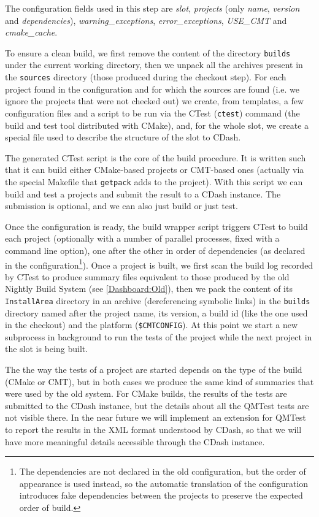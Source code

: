 \documentclass{lhcbnote}
\begin{document}
The configuration fields used in this step are \emph{slot}, \emph{projects}
(only \emph{name}, \emph{version} and \emph{dependencies}),
\emph{warning\_exceptions}, \emph{error\_exceptions}, \emph{USE\_CMT} and
\emph{cmake\_cache}.

To ensure a clean build, we first remove the content of the directory
\texttt{builds} under the current working directory, then we unpack all the
archives present in the \texttt{sources} directory (those produced during the
checkout step).  For each project found in the configuration and for which the
sources are found (i.e. we ignore the projects that were not checked out) we
create, from templates, a few configuration files and a script to be run via the
CTest\cite{CMake} (\texttt{ctest}) command (the build and test tool distributed
with CMake), and, for the whole slot, we create a special file used to describe
the structure of the slot to CDash.

The generated CTest script is the core of the build procedure.  It is written
such that it can build either CMake-based projects or CMT-based\cite{CMT} ones
(actually via the special Makefile that \texttt{getpack} adds to the project).
With this script we can build and test a projects and submit the result to a
CDash instance. The submission is optional, and we can also just build or just
test.

Once the configuration is ready, the build wrapper script triggers CTest to
build each project (optionally with a number of parallel processes, fixed with a
command line option), one after the other in order of dependencies (as declared
in the configuration\footnote{The dependencies are not declared in the old
configuration, but the order of appearance is used instead, so the automatic
translation of the configuration introduces fake dependencies between the
projects to preserve the expected order of build.}).  Once a project is built,
we first scan the build log recorded by CTest to produce summary files
equivalent to those produced by the old Nightly Build System (see
\ref{Dashboard:Old}), then we pack the content of its \texttt{InstallArea}
directory in an archive (dereferencing symbolic links) in the \texttt{builds}
directory named after the project name, its version, a build id (like the one
used in the checkout) and the platform (\texttt{\$CMTCONFIG}).  At this point we
start a new subprocess in background to run the tests of the project while the
next project in the slot is being built.

The the way the tests of a project are started depends on the type of the build
(CMake or CMT), but in both cases we produce the same kind of summaries that
were used by the old system.  For CMake builds, the results of the tests are
submitted to the CDash instance, but the details about all the QMTest tests are
not visible there.  In the near future we will implement an extension for QMTest
to report the results in the XML format understood by CDash, so that we will
have more meaningful details accessible through the CDash instance.
\end{document}
